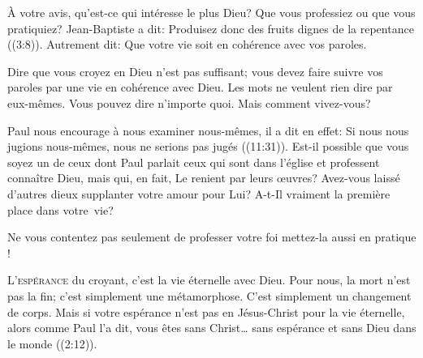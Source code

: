À votre avis, qu'est-ce qui intéresse le plus Dieu?
 Que vous professiez ou que vous pratiquiez?
 Jean-Baptiste a dit: 
 \Og Produisez donc des fruits dignes de la repentance \Fg{}
 ((3:8)).
 Autrement dit: 
 \Og Que votre vie soit en cohérence avec vos paroles. \Fg{}


Dire que vous croyez en Dieu n'est pas suffisant;
 vous devez faire suivre vos paroles par une vie en cohérence avec Dieu.
 Les mots ne veulent rien dire par eux-mêmes. Vous pouvez dire n'importe quoi.
 Mais  comment vivez-vous? 

Paul nous encourage à nous examiner nous-mêmes,
 il a dit en effet: 
 \Og Si nous nous jugions nous-mêmes, nous ne serions pas jugés \Fg{}
 ((11:31)).
 Est-il possible que vous soyez un de ceux dont Paul parlait
 \ocadr ceux qui sont dans l'église et professent connaître Dieu, mais qui,
 en fait, Le renient par leurs \oe{}uvres? Avez-vous laissé d'autres dieux
 supplanter votre amour pour Lui?
 A-t-Il vraiment la première place dans votre~vie? 

Ne vous contentez pas seulement de professer votre foi
 \ocadr mettez-la 
 aussi en pratique ! 

\dvrule






\lettrine{L}{'espérance} du croyant, c'est la vie éternelle avec Dieu.
 Pour nous, la mort n'est pas la fin; c'est simplement une métamorphose.
 C'est simplement un changement de corps. Mais si votre espérance n'est pas
 en Jésus-Christ pour la vie éternelle, alors comme Paul l'a dit, vous êtes
 \Og sans Christ\dots{} sans espérance et sans Dieu dans le monde \Fg{}
 ((2:12)). 

